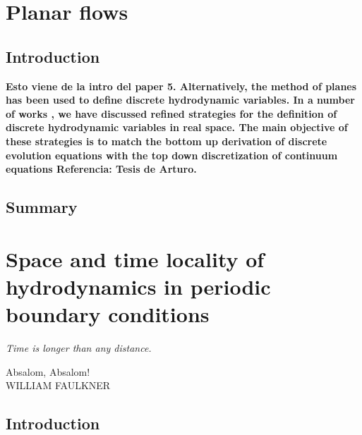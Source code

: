 \documentclass[a4paper,openright,12pt]{book}
\newcommand{\Note}[1]{{\bf \color{red}#1}}    %
\begin{document}
\chapter{Planar flows}\label{Chap:Planar}
\section{Introduction}

\Note{ Esto viene de la intro del paper 5. Alternatively,  the method  of planes  \cite{Davis1996,Travis2000} has
been used to  define discrete hydrodynamic variables.  In  a number of
works
\cite{Espanol2009i,DelaTorre2011,DelaTorre2015,EspanolDonev2015},   we
have  discussed  refined strategies  for  the  definition of  discrete
hydrodynamic variables  in real  space.  The  main objective  of these
strategies is to match the  bottom up derivation of discrete evolution
equations  with the  top  down discretization  of continuum  equations
Referencia: Tesis de Arturo.}


\section{Summary}

\chapter{Space and time locality of hydrodynamics in periodic boundary conditions}\label{Chap:PBC}
\epigraph{\textit{Time is longer than any distance.}}{Absalom, Absalom! \\ WILLIAM FAULKNER}
\section{Introduction}

%
\end{document}
